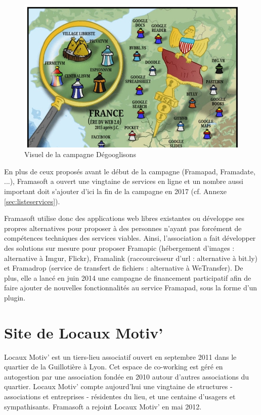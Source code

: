 \documentclass[10pt,a4paper, twoside]{report}
\begin{document}
	\begin{figure}[ht]
		\centerline{\includegraphics[width=1\textwidth]{images/degooglisons-internet.jpg}}
		\caption{Visuel de la campagne Dégooglisons}
		\label{visuel-campagne}
	\end{figure}

	
	En plus de ceux proposés avant le début de la campagne (Framapad, Framadate, ...), Framasoft a ouvert une vingtaine de services en ligne et un nombre aussi important doit s'ajouter d'ici la fin de la campagne en 2017 (cf. Annexe \ref{sec:listeservices}).
	
	Framasoft utilise donc des applications web libres existantes ou développe ses propres alternatives pour proposer à des personnes n'ayant pas forcément de compétences techniques des services viables.
	Ainsi, l'association a fait développer des solutions sur mesure pour proposer Framapic (hébergement d'images : alternative à Imgur, Flickr), Framalink (raccourcisseur d'url : alternative à bit.ly) et Framadrop (service de transfert de fichiers : alternative à WeTransfer). De plus, elle a lancé en juin 2014 une campagne de financement participatif afin de faire ajouter de nouvelles fonctionnalités au service Framapad, sous la forme d'un plugin.
	
	\section{Site de Locaux Motiv'}
	Locaux Motiv' est un tiers-lieu associatif ouvert en septembre 2011 dans le quartier de la Guillotière à Lyon. Cet espace de co-working est géré en autogestion par une association fondée en 2010 autour d'autres associations du quartier.
	Locaux Motiv' compte aujourd’hui une vingtaine de structures - associations et entreprises - résidentes du lieu, et une centaine d'usagers et sympathisants. Framasoft a rejoint Locaux Motiv' en mai 2012.
	
\end{document}
